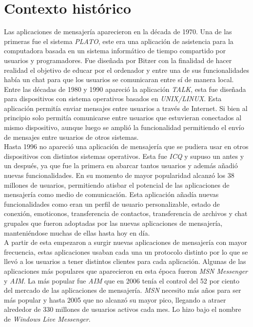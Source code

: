 \section{Contexto histórico}
Las aplicaciones de mensajería aparecieron en la década de 1970. Una de las primeras fue el sistema \emph{PLATO}, este era una aplicación de asistencia para la computadora basada en un sistema informático de tiempo compartido por usuarios y programadores. Fue diseñada por Bitzer con la finalidad de hacer realidad el objetivo de educar por el ordenador y entre una de sus funcionalidades había un chat para que los usuarios se comunicaran entre sí de manera local.\\ 
Entre las décadas de 1980 y 1990 apareció la aplicación \emph{TALK}, esta fue diseñada para dispositivos con sistema operativos basados en \emph{UNIX/LINUX}. Esta aplicación permitía enviar mensajes entre usuarios a través de Internet. Si bien al principio solo permitía comunicarse entre usuarios que estuvieran conectados al mismo dispositivo, aunque luego se amplió la funcionalidad permitiendo el envío de mensajes entre usuarios de otros sistemas.\\
Hasta 1996 no apareció una aplicación de mensajería que se pudiera usar en otros dispositivos con distintos sistemas operativos. 
Esta fue \emph{ICQ} y supuso un antes y un después, ya que fue la primera en abarcar tantos usuarios y además añadió nuevas funcionalidades. En su momento de mayor popularidad alcanzó los 38 millones de usuarios, permitiendo atisbar el potencial de las aplicaciones de mensajería como medio de comunicación.
Esta aplicación añadía nuevas funcionalidades como eran un perfil de usuario personalizable, estado de conexión, emoticonos, transferencia de contactos, transferencia de archivos y chat grupales que fueron adoptadas por las nuevas aplicaciones de mensajería, manteniéndose muchas de ellas hasta hoy en día.\\
A partir de esta empezaron a surgir nuevas aplicaciones de mensajería con mayor frecuencia, estas aplicaciones usaban cada una un protocolo distinto por lo que se llevó a los usuarios a tener distintos clientes para cada aplicación.
Algunas de las aplicaciones más populares que aparecieron en esta época fueron \emph{MSN Messenger} y \emph{AIM}. La más popular fue \emph{AIM} que en 2006 tenía el control del 52 por ciento del mercado de las aplicaciones de mensajería. \emph{MSN} necesito más años para ser más popular y hasta 2005 que no alcanzó su mayor pico, llegando a atraer alrededor de 330 millones de usuarios activos cada mes. Lo hizo bajo el nombre de \emph{Windows Live Messenger}.\\ 

